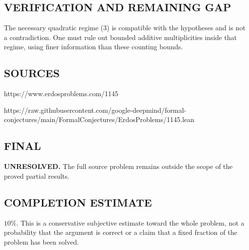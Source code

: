 \subsection*{VERIFICATION AND REMAINING GAP}
The necessary quadratic regime (3) is compatible with the hypotheses and
is not a contradiction. One must rule out bounded additive multiplicities
inside that regime, using finer information than these counting bounds.

\subsection*{SOURCES}
https://www.erdosproblems.com/1145

https://raw.githubusercontent.com/google-deepmind/formal-conjectures/main/FormalConjectures/ErdosProblems/1145.lean

\subsection*{FINAL}
\textbf{UNRESOLVED.} The full source problem remains outside the scope of the proved partial results.

\subsection*{COMPLETION ESTIMATE}
$10\%$. This is a conservative subjective estimate toward the whole problem, not a probability that the argument is correct or a claim that a fixed fraction of the problem has been solved.
